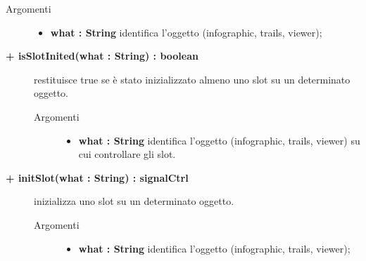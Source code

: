 \begin{description}
\begin{description}
		\begin{description}
			\item[Argomenti] \hfill
				\begin{itemize}
				
					\item \textbf{what : String			} \hfill
					identifica l'oggetto (infographic, trails, viewer);
					
				\end{itemize}
		\end{description}
	\end{description}
			
	\begin{description}
		\item[\textbf{\color{blue}+ isSlotInited(what : String) : boolean			}] \hfill
			restituisce true se è stato inizializzato almeno uno slot su un determinato oggetto.
			
		\begin{description}
			\item[Argomenti] \hfill
				\begin{itemize}
				
					\item \textbf{what : String			} \hfill
					identifica l'oggetto (infographic, trails, viewer) su cui controllare gli slot.
					
				\end{itemize}
		\end{description}
	\end{description}
	
	\begin{description}
		\item[\textbf{\color{blue}+ initSlot(what : String) : signalCtrl			}] \hfill
			inizializza uno slot su un determinato oggetto.
			
		\begin{description}
			\item[Argomenti] \hfill
				\begin{itemize}
				
					\item \textbf{what : String			} \hfill
					identifica l'oggetto (infographic, trails, viewer);
					
				\end{itemize}
		\end{description}
	\end{description}
				

\end{description}






























